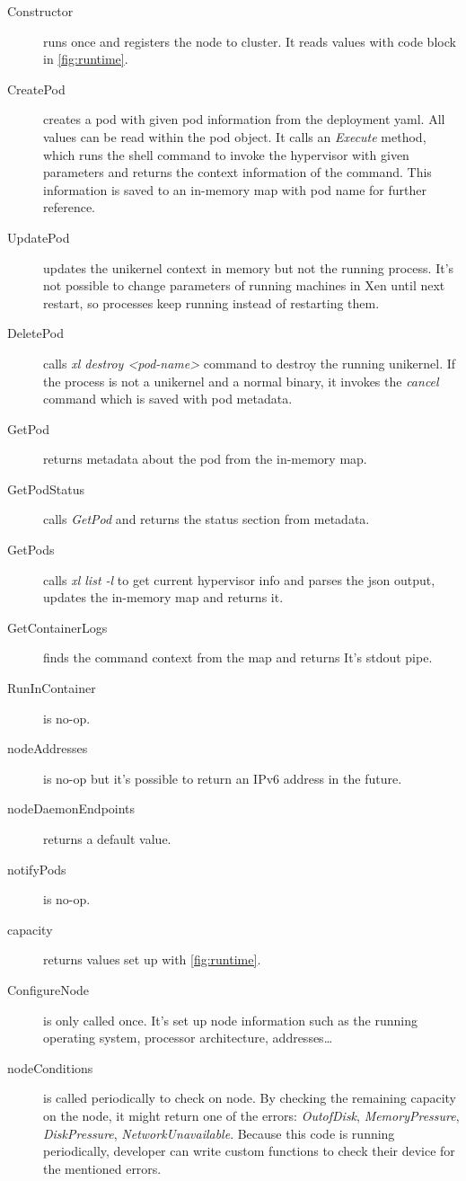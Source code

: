 \begin{description}
  \item  [Constructor] runs once and registers the node to cluster. It reads values with code block in \ref{fig:runtime}.
  \item [CreatePod] creates a pod with given pod information from the deployment yaml. All values can be read within the pod object. It calls an \textit{Execute} method, which runs the shell command to invoke the hypervisor with given parameters and returns the context information of the command. This information is saved to an in-memory map with pod name for further reference.
  \item [UpdatePod] updates the unikernel context in memory but not the running process. It's not possible to change parameters of running machines in Xen until next restart, so processes keep running instead of restarting them.
  \item [DeletePod] calls \textit{xl destroy <pod-name>} command to destroy the running unikernel. If the process is not a unikernel and a normal binary, it invokes the \textit{cancel} command which is saved with pod metadata.
  \item [GetPod] returns metadata about the pod from the in-memory map.
  \item [GetPodStatus] calls \textit{GetPod} and returns the status section from metadata.
  \item [GetPods] calls \textit{xl list -l} to get current hypervisor info and parses the json output, updates the in-memory map and returns it.
  \item [GetContainerLogs] finds the command context from the map and returns It's stdout pipe.
  \item [RunInContainer] is no-op.
  \item [nodeAddresses] is no-op but it's possible to return an IPv6 address in the future.
  \item [nodeDaemonEndpoints] returns a default value.
  \item [notifyPods] is no-op.
  \item [capacity] returns values set up with \ref{fig:runtime}.
  \item [ConfigureNode] is only called once. It's set up node information such as the running operating system, processor architecture, addresses\ldots
  \item [nodeConditions] is called periodically to check on node. By checking the remaining capacity on the node, it might return one of the errors: \textit{OutofDisk}, \textit{MemoryPressure}, \textit{DiskPressure}, \textit{NetworkUnavailable}. Because this code is running periodically, developer can write custom functions to check their device for the mentioned errors.
  \end{description}
